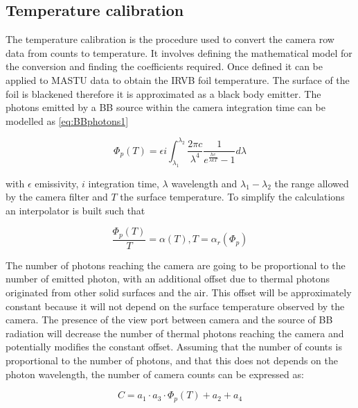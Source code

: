 \subsection{Temperature calibration}
The temperature calibration is the procedure used to convert the camera row data from counts to temperature. It involves defining the mathematical model for the conversion and finding the coefficients required. Once defined it can be applied to MASTU data to obtain the IRVB foil temperature.
The surface of the foil is blackened therefore it is approximated as a black body emitter. The photons emitted by a BB source within the camera integration time can be modelled as \autoref{eq:BBphotons1}


\begin{equation}
{\Phi}_p (T) = \epsilon i \int_{ {\lambda}_1 }^{ {\lambda}_2 } {\frac{2 \pi c } { {\lambda}^4 } \frac {1} { e^{\frac {hc} {\lambda k T}} -1} {d \lambda} }
\label{eq:BBphotons1}
\end{equation}

with $\epsilon$ emissivity, $i$ integration time, $\lambda$ wavelength and $\lambda_1-\lambda_2$ the range allowed by the camera filter and $T$ the surface temperature.
To simplify the calculations an interpolator is built such that

\begin{equation}
\frac {{\Phi}_p (T)} {T} = \alpha (T) , T = {\alpha}_r ({\Phi}_p)
\label{eq:BBphotons2}
\end{equation}

The number of photons reaching the camera are going to be proportional to the number of emitted photon, with an additional offset due to thermal photons originated from other solid surfaces and the air. This offset will be approximately constant because it will not depend on the surface temperature observed by the camera.
The presence of the view port between camera and the source of BB radiation will decrease the number of thermal photons reaching the camera and potentially modifies the constant offset.
Assuming that the number of counts is proportional to the number of photons, and that this does not depends on the photon wavelength, the number of camera counts can be expressed as:

\begin{equation}
C = a_1 \cdot a_3 \cdot {\Phi}_p (T) + a_2 + a_4
\label{eq:BBphotons3}
\end{equation}

